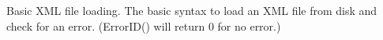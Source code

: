  Basic X\+ML file loading. The basic syntax to load an X\+ML file from disk and check for an error. (Error\+I\+D() will return 0 for no error.) 
\begin{DoxyCodeInclude}{0}

\end{DoxyCodeInclude}
 